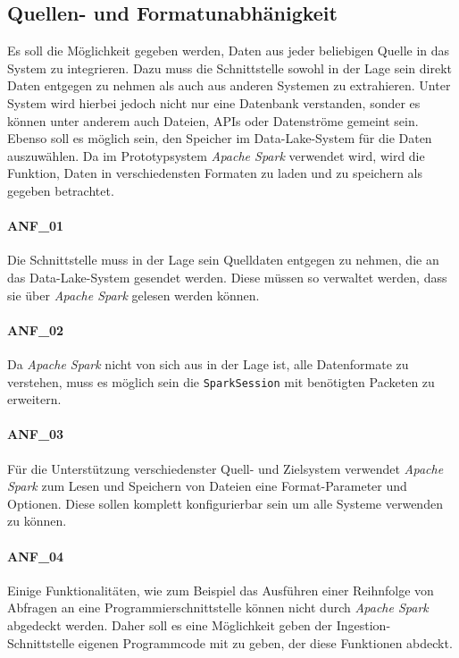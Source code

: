 \subsection{Quellen- und Formatunabhänigkeit}
Es soll die Möglichkeit gegeben werden, Daten aus jeder beliebigen Quelle in das System zu integrieren.
Dazu muss die Schnittstelle sowohl in der Lage sein direkt Daten entgegen zu nehmen als auch aus anderen Systemen zu extrahieren.
Unter System wird hierbei jedoch nicht nur eine Datenbank verstanden, sonder es können unter anderem auch Dateien, APIs oder Datenströme gemeint sein.
Ebenso soll es möglich sein, den Speicher im Data-Lake-System für die Daten auszuwählen.
Da im Prototypsystem \textit{Apache Spark} verwendet wird, wird die Funktion, Daten in verschiedensten Formaten zu laden und zu speichern als gegeben betrachtet.

\paragraph{ANF\_01}
Die Schnittstelle muss in der Lage sein Quelldaten entgegen zu nehmen, die an das Data-Lake-System gesendet werden.
Diese müssen so verwaltet werden, dass sie über \textit{Apache Spark} gelesen werden können.

\paragraph{ANF\_02}
Da \textit{Apache Spark} nicht von sich aus in der Lage ist, alle Datenformate zu verstehen, muss es möglich sein die \verb|SparkSession| mit benötigten Packeten zu erweitern.

\paragraph{ANF\_03}
Für die Unterstützung verschiedenster Quell- und Zielsystem verwendet \textit{Apache Spark} zum Lesen und Speichern von Dateien eine Format-Parameter und Optionen.
Diese sollen komplett konfigurierbar sein um alle Systeme verwenden zu können.

\paragraph{ANF\_04}
Einige Funktionalitäten, wie zum Beispiel das Ausführen einer Reihnfolge von Abfragen an eine Programmierschnittstelle können nicht durch \textit{Apache Spark} abgedeckt werden.
Daher soll es eine Möglichkeit geben der Ingestion-Schnittstelle eigenen Programmcode mit zu geben, der diese Funktionen abdeckt.

